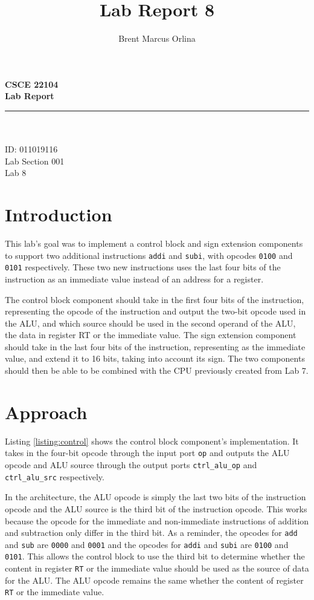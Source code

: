 \documentclass[11pt]{report}
\makeatletter
\newcommand{\@labsection}{000}
\newcommand{\labsection}[1]{
    \renewcommand{\@labsection}{#1}
}
\newcommand{\@labnumber}{0}
\newcommand{\labnumber}[1]{
    \renewcommand{\@labnumber}{#1}
}
\newcommand{\@shortsubmitted}{1/1/70}
\newcommand{\shortsubmitted}[1]{
    \renewcommand{\@shortsubmitted}{#1}
}
\renewcommand{\maketitle}{
    \newgeometry{left=1in, right=1in, top=1.75in, textheight=8.25in}
    \singlespacing
    \begin{center}
        {\huge \bf CSCE 22104} \\
        \vspace{2.5em}
        {\Large \bf Lab Report} \\
        \vspace{2em}
        \noindent\rule{20em}{0.4pt} \\
        \vspace{1em}
        {\Large \@author} \\
        \vspace{.75em}
        {\normalsize ID: 011019116} \\
        \vspace{.75em}
        {\normalsize Lab Section \@labsection} \\
        \vspace{.75em}
        {\normalsize Lab \@labnumber} \\
    \end{center}
    \newpage
    \restoregeometry
}
\makeatother
\begin{document}
\title{Lab Report 8}
\author{Brent Marcus Orlina}

\labsection{001}
\labnumber{8}

\shortsubmitted{4/9/25}

\maketitle

\section*{Introduction}
This lab's goal was to implement a control block and sign extension components to support two
additional instructions \verb|addi| and \verb|subi|, with opcodes \verb|0100| and \verb|0101|
respectively. These two new instructions uses the last four bits of the instruction as an immediate
value instead of an address for a register.

The control block component should take in the first four bits of the instruction, representing the
opcode of the instruction and output the two-bit opcode used in the ALU, and which source should be
used in the second operand of the ALU, the data in register RT or the immediate value. The sign
extension component should take in the last four bits of the instruction, representing as the
immediate value, and extend it to 16 bits, taking into account its sign. The two components should
then be able to be combined with the CPU previously created from Lab 7.

\section*{Approach}

Listing \ref{listing:control} shows the control block component's implementation. It takes in the
four-bit opcode through the input port \verb|op| and outputs the ALU opcode and ALU source through
the output ports \verb|ctrl_alu_op| and \verb|ctrl_alu_src| respectively.

In the architecture, the ALU opcode is simply the last two bits of the instruction opcode and the
ALU source is the third bit of the instruction opcode. This works because the opcode for the
immediate and non-immediate instructions of addition and subtraction only differ in the third bit.
As a reminder, the opcodes for \verb|add| and \verb|sub| are \verb|0000| and \verb|0001| and the
opcodes for \verb|addi| and \verb|subi| are \verb|0100| and \verb|0101|. This allows the control
block to use the third bit to determine whether the content in register \verb|RT| or the immediate
value should be used as the source of data for the ALU. The ALU opcode remains the same whether the
content of register \verb|RT| or the immediate value.
\end{document}
